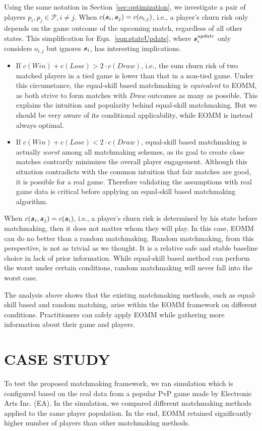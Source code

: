 Using the same notation in Section~\ref{sec:optimization}, we investigate a pair of players $p_i, p_j \in \mathcal{P}, i \neq j$. When $c(\boldsymbol{s}_i, \boldsymbol{s}_j) = c(o_{i,j})$, i.e., a player's churn risk only depends on the game outcome of the upcoming match, regardless of all other states. This simplification for Eqn.~\ref{eqn:stateUpdate}, where $\boldsymbol{s}_i^{update}$ only considers $o_{i,j}$ but ignores $\boldsymbol{s}_i$, has  interesting implications.
\begin{itemize}
\item If $c(Win)+c(Lose) > 2\cdot c(Draw)$, i.e., the sum churn risk of two matched players in a tied game is lower than that in a non-tied game. Under this circumstance, the equal-skill based matchmaking is \emph{equivalent} to EOMM, as both strive to form matches with \emph{Draw} outcomes as many as possible. This explains the intuition and popularity behind equal-skill matchmaking. But we should be very aware of its conditional applicability, while EOMM is instead always optimal.
\item If $c(Win) + c(Lose)< 2\cdot c(Draw)$, equal-skill based matchmaking is actually \emph{worst} among all matchmaking schemes, as its goal to create close matches contrarily minimizes the overall player engagement. Although this situation contradicts with the common intuition that fair matches are good, it is possible for a real game. Therefore validating the assumptions with real game data is critical before applying an equal-skill based matchmaking algorithm.
\end{itemize}

When $c(\boldsymbol{s}_i, \boldsymbol{s}_j) = c(\boldsymbol{s}_i)$, i.e., a player's churn risk is determined by his state before matchmaking, then it does not matter whom they will play. In this case, EOMM can do no better than a random matchmaking. Random matchmaking, from this perspective, is not as trivial as we thought. It is a relative safe and stable baseline choice in lack of prior information. While equal-skill based method can perform the worst under certain conditions, random matchmaking will never fall into the worst case.

The analysis above shows that the existing matchmaking methods, such as equal-skill based and random matching, arise within the EOMM framework on different conditions. Practitioners can safely apply EOMM while gathering more information about their game and players.

\section{CASE STUDY}\label{sec:casestudy}
To test the proposed matchmaking framework, we ran simulation which is configured  based on the real data from a popular PvP game made by Electronic Arts Inc.\! (EA). In the simulation, we compared different matchmaking methods applied to the same player population. In the end, EOMM retained significantly higher number of players than other matchmaking methods.

